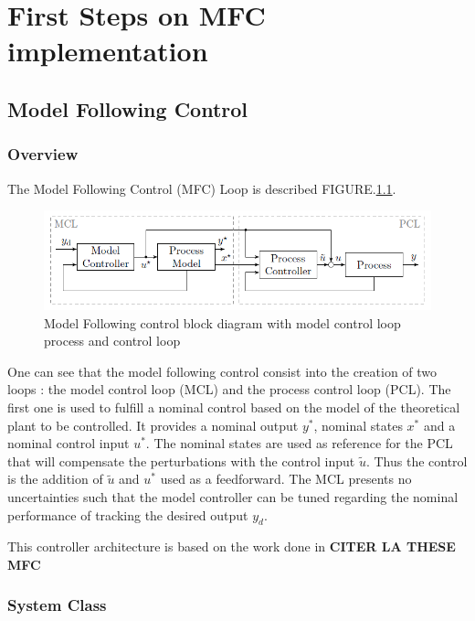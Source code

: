 \chapter{First Steps on MFC implementation}

\section{Model Following Control}
\label{sec:MFC}

\subsection{Overview}

The Model Following Control (MFC) Loop is described FIGURE.\ref{fig:MFC Control Loop}.

\begin{figure}[htbp]
    \centering
    \includegraphics[width=1\linewidth]{imgs/section1/MFC_scheme.PNG}
    \caption{Model Following control block diagram with model control loop process and control loop}
    \label{fig:MFC Control Loop}
\end{figure}

One can see that the model following control consist into the creation of two loops : the model control loop (MCL) and the process control loop (PCL). The first one is used to fulfill a nominal control based on the model of the theoretical plant to be controlled. It provides a nominal output \(y^*\), nominal states \(x^*\) and a nominal control input \(u^*\). The nominal states are used as reference for the PCL that will compensate the perturbations with the control input \(\tilde{u}\). Thus the control is the addition of \(\tilde{u}\) and \(u^*\) used as a feedforward. The MCL presents no uncertainties such that the model controller can be tuned regarding the nominal performance of tracking the desired
output \(y_d\). 

This controller architecture is based on the work done in \textbf{CITER LA THESE MFC}


\subsection{System Class}


